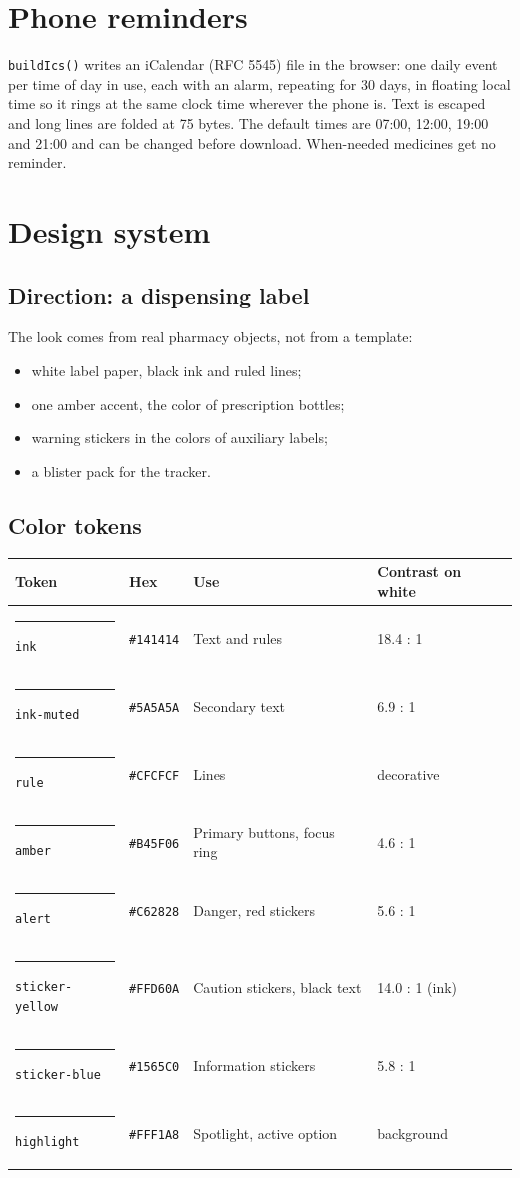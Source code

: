 \documentclass[11pt]{article}
\begin{document}
\section{Phone reminders}
\texttt{buildIcs()} writes an iCalendar (RFC 5545) file in the browser: one daily event per time of day in use, each with an alarm, repeating for 30 days, in floating local time so it rings at the same clock time wherever the phone is. Text is escaped and long lines are folded at 75 bytes. The default times are 07:00, 12:00, 19:00 and 21:00 and can be changed before download. When-needed medicines get no reminder.

\section{Design system}
\subsection{Direction: a dispensing label}
The look comes from real pharmacy objects, not from a template:
\begin{itemize}
  \item white label paper, black ink and ruled lines;
  \item one amber accent, the color of prescription bottles;
  \item warning stickers in the colors of auxiliary labels;
  \item a blister pack for the tracker.
\end{itemize}

\subsection{Color tokens}
\begin{tabularx}{\linewidth}{@{}l l X l@{}}
\toprule
Token & Hex & Use & Contrast on white \\
\midrule
\textcolor{ink}{\rule{5mm}{3mm}} \texttt{ink} & \texttt{\#141414} & Text and rules & 18.4 : 1 \\
\textcolor{inkmuted}{\rule{5mm}{3mm}} \texttt{ink-muted} & \texttt{\#5A5A5A} & Secondary text & 6.9 : 1 \\
\textcolor{rule}{\rule{5mm}{3mm}} \texttt{rule} & \texttt{\#CFCFCF} & Lines & decorative \\
\textcolor{amber}{\rule{5mm}{3mm}} \texttt{amber} & \texttt{\#B45F06} & Primary buttons, focus ring & 4.6 : 1 \\
\textcolor{alert}{\rule{5mm}{3mm}} \texttt{alert} & \texttt{\#C62828} & Danger, red stickers & 5.6 : 1 \\
\textcolor{stickeryellow}{\rule{5mm}{3mm}} \texttt{sticker-yellow} & \texttt{\#FFD60A} & Caution stickers, black text & 14.0 : 1 (ink) \\
\textcolor{stickerblue}{\rule{5mm}{3mm}} \texttt{sticker-blue} & \texttt{\#1565C0} & Information stickers & 5.8 : 1 \\
\textcolor{highlight}{\rule{5mm}{3mm}} \texttt{highlight} & \texttt{\#FFF1A8} & Spotlight, active option & background \\
\bottomrule
\end{tabularx}
\end{document}
